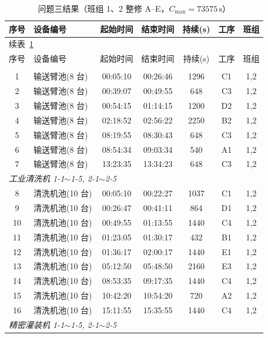 \documentclass[12pt,a4paper]{ctexart}
\begin{document}
\begin{longtable}{c p{4.2cm} c c c c c}
\caption{问题三结果（班组 1、2 整修 A--E，$C_{\max}=73575\,\mathrm{s}$）}\label{tab:q3}\\
\toprule
序号 & 设备编号 & 起始时间 & 结束时间 & 持续(s) & 工序 & 班组 \\
\midrule
\endfirsthead
\multicolumn{7}{l}{\small 续表~\ref{tab:q3}}\\
\toprule
序号 & 设备编号 & 起始时间 & 结束时间 & 持续(s) & 工序 & 班组 \\
\midrule
\endhead
\bottomrule
\endfoot
\multicolumn{7}{l}{\textit{自动化输送臂 1-1$\sim$1-4, 2-1$\sim$2-4}}\\
1 & 输送臂池(8 台) & 00:05:10 & 00:26:46 & 1296 & C1 & 1,2 \\
2 & 输送臂池(8 台) & 00:39:07 & 00:49:55 & 648 & C3 & 1,2 \\
3 & 输送臂池(8 台) & 00:54:15 & 01:14:15 & 1200 & D2 & 1,2 \\
4 & 输送臂池(8 台) & 02:18:52 & 02:56:22 & 2250 & B2 & 1,2 \\
5 & 输送臂池(8 台) & 08:19:55 & 08:30:43 & 648 & C3 & 1,2 \\
6 & 输送臂池(8 台) & 08:54:34 & 09:03:34 & 540 & A1 & 1,2 \\
7 & 输送臂池(8 台) & 13:23:35 & 13:34:23 & 648 & C3 & 1,2 \\
\midrule
\multicolumn{7}{l}{\textit{工业清洗机 1-1$\sim$1-5, 2-1$\sim$2-5}}\\
8 & 清洗机池(10 台) & 00:05:10 & 00:22:27 & 1037 & C1 & 1,2 \\
9 & 清洗机池(10 台) & 00:26:47 & 00:41:11 & 864 & D1 & 1,2 \\
10 & 清洗机池(10 台) & 00:49:55 & 01:13:55 & 1440 & C4 & 1,2 \\
11 & 清洗机池(10 台) & 01:23:05 & 01:30:17 & 432 & B1 & 1,2 \\
12 & 清洗机池(10 台) & 01:36:17 & 02:00:17 & 1440 & E1 & 1,2 \\
13 & 清洗机池(10 台) & 05:12:50 & 05:48:50 & 2160 & E3 & 1,2 \\
14 & 清洗机池(10 台) & 08:53:35 & 09:17:35 & 1440 & C4 & 1,2 \\
15 & 清洗机池(10 台) & 10:42:20 & 10:54:20 & 720 & A2 & 1,2 \\
16 & 清洗机池(10 台) & 15:11:55 & 15:35:55 & 1440 & C4 & 1,2 \\
\midrule
\multicolumn{7}{l}{\textit{精密灌装机 1-1$\sim$1-5, 2-1$\sim$2-5}}\\

\end{longtable}
\end{document}
